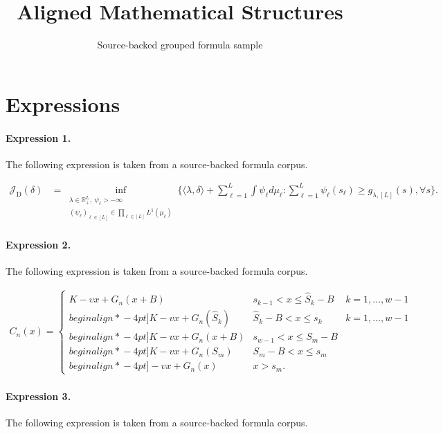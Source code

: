 \documentclass[11pt]{article}
\title{Aligned Mathematical Structures}
\author{Source-backed grouped formula sample}
\date{}
\begin{document}
\maketitle
\section{Expressions}
\paragraph{Expression 1.} The following expression is taken from a source-backed formula corpus.

\begin{align*}\mathcal{J}_{\mathrm{D}}(\delta) & = \inf_{\substack{ \lambda \in \mathbb{R}_{+}^L, \ \psi_\ell > - \infty \\ (\psi_\ell)_{\ell \in [L]} \in \prod_{\ell \in [L]} L^1(\mu_\ell) } } \Bigg\{ \langle \lambda, \delta \rangle + \sum_{\ell=1}^L \int \psi_\ell d \mu_\ell : \sum_{\ell=1}^L \psi_\ell(s_\ell) \ge g_{\lambda, [L]}(s), \forall s \Bigg \}.\end{align*}

\paragraph{Expression 2.} The following expression is taken from a source-backed formula corpus.

\begin{align*}C_n(x)=\left\{\begin{array}{lrlr}K-vx+G_n(x+B)&s_{k-1}< x\leq \widehat{S}_{k}-B&k=1,\ldots,w-1\\begin{align*}-4pt]K-vx+G_n(\widehat{S}_k)&\widehat{S}_{k}-B< x\leq s_{k} &k=1,\ldots,w-1\\begin{align*}-4pt]K-vx+G_n(x+B)&s_{w-1}< x\leq S_m-B\\begin{align*}-4pt]K-vx+G_n(S_m)&S_m-B< x\leq s_m\\begin{align*}-4pt]-vx+G_n(x)&x> s_m.\end{array}\right.\end{align*}

\paragraph{Expression 3.} The following expression is taken from a source-backed formula corpus.
\end{document}
